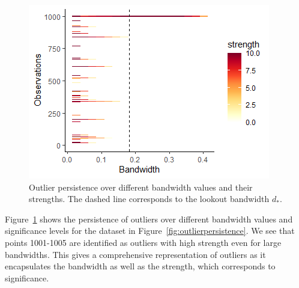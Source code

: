 \documentclass[letter,12pt]{article}
\begin{document}
\begin{figure}[!ht]
    \centering
    \includegraphics[scale=0.8]{Graphics/persistence_alpha.png}
    \caption{Outlier persistence over different bandwidth values and their strengths. The dashed line corresponds to the lookout bandwidth $d_*$.}
    \label{fig:outlierpersistence2}
\end{figure}

Figure~\ref{fig:outlierpersistence2} shows the persistence of outliers  over different bandwidth values and significance levels for the dataset in Figure~\ref{fig:outlierpersistence}. We see that points 1001-1005 are identified as outliers with high strength even for large bandwidths. This gives a comprehensive representation of outliers as it encapsulates the bandwidth as well as the strength, which corresponds to significance.




\end{document}
